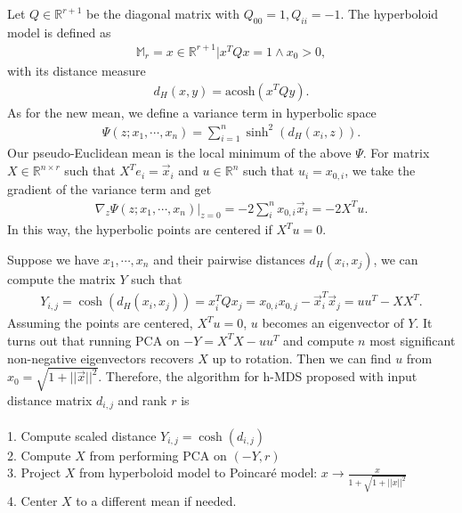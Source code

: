 Let $Q \in \mathbb{R}^{r+1}$ be the diagonal matrix with $Q_{00} = 1, Q_{ii} = -1$. The hyperboloid model is defined as 
\begin{align*}
    \mathbb{M}_r = {x \in \mathbb{R}^{r+1}|x^TQx = 1 \wedge x_0 > 0},
\end{align*}
with its distance measure
\begin{align*}
    d_H(x, y) = \text{acosh}(x^TQy).
\end{align*}
As for the new mean, we define a variance term in hyperbolic space
\begin{align*}
    \Psi(z; x_1, \cdots, x_n) = \sum^n_{i=1}\sinh^2(d_H(x_i, z)).
\end{align*}
Our pseudo-Euclidean mean is the local minimum of the above $\Psi$. For matrix $X \in \mathbb{R}^{n \times r}$ such that $X^Te_i = \Vec{x}_i$ and $u \in \mathbb{R}^n$ such that $u_i = x_{0, i}$, we take the gradient of the variance term and get
\begin{align*}
    \nabla_z \Psi(z; x_1, \cdots, x_n)|_{z= 0} = -2 \sum^n_i x_{0, i}\Vec{x}_i = -2X^Tu. 
\end{align*}
In this way, the hyperbolic points are centered if $X^Tu = 0$. 

Suppose we have $x_1, \cdots, x_n$ and their pairwise distances $d_H(x_i, x_j)$, we can compute the matrix $Y$ such that 
\begin{align*}
    Y_{i, j} = \cosh(d_H(x_i, x_j)) = x_i^TQx_j = x_{0, i}x_{0, j} - \Vec{x}_i^T\Vec{x}_j = uu^T - XX^T.
\end{align*}
Assuming the points are centered, $X^Tu = 0$, $u$ becomes an eigenvector of $Y$. It turns out that running PCA on $-Y = X^TX - uu^T$ and compute $n$ most significant non-negative eigenvectors recovers $X$ up to rotation. Then we can find $u$ from $x_0 = \sqrt{1 + ||\Vec{x}||^2}$. Therefore, the algorithm for h-MDS proposed with input distance matrix $d_{i, j}$ and rank $r$ is \\
\horrule{0.5pt} \\
1. Compute scaled distance $Y_{i, j} = \cosh(d_{i, j})$\\
2. Compute $X$ from performing PCA on $(-Y, r)$\\
3. Project $X$ from hyperboloid model to Poincar\'e model: $x \rightarrow \frac{x}{1 + \sqrt{1 + ||x||^2}}$\\
4. Center $X$ to a different mean if needed. \\
\horrule{0.5pt} \\

